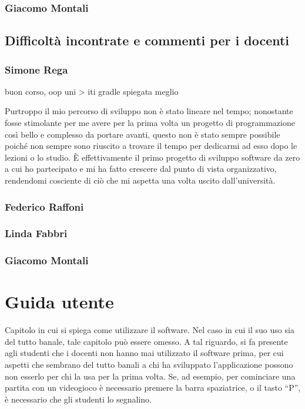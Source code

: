 \documentclass[a4paper,12pt]{report}
\begin{document}
\subsection{Giacomo Montali}

\section{Difficoltà incontrate e commenti per i docenti}

\subsection{Simone Rega}

buon corso, oop uni > iti
gradle spiegata meglio

Purtroppo il mio percorso di sviluppo non è stato lineare nel tempo; nonostante fosse stimolante per me avere per la prima volta un progetto di programmazione così bello e complesso da portare avanti, questo non è stato sempre possibile poiché non sempre sono riuscito a trovare il tempo per dedicarmi ad esso dopo le lezioni o lo studio. È effettivamente il primo progetto di sviluppo software da zero a cui ho partecipato e mi ha fatto crescere dal punto di vista organizzativo, rendendomi cosciente di ciò che mi aspetta una volta uscito dall'università.
\subsection{Federico Raffoni}
\subsection{Linda Fabbri}
\subsection{Giacomo Montali}
\appendix
\chapter{Guida utente}

Capitolo in cui si spiega come utilizzare il software. Nel caso in cui il suo uso sia del tutto
banale, tale capitolo può essere omesso.
%
A tal riguardo, si fa presente agli studenti che i docenti non hanno mai utilizzato il software
prima, per cui aspetti che sembrano del tutto banali a chi ha sviluppato l'applicazione possono non
esserlo per chi la usa per la prima volta.
%
Se, ad esempio, per cominciare una partita con un videogioco è necessario premere la barra
spaziatrice, o il tasto ``P'', è necessario che gli studenti lo segnalino.
\end{document}
